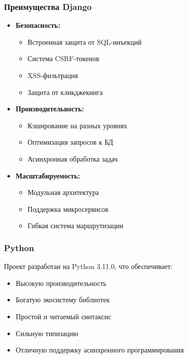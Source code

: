 \documentclass[12pt,a4paper]{article}
\begin{document}
\subsubsection{Преимущества Django}
\begin{itemize}
    \item \textbf{Безопасность:}
    \begin{itemize}
        \item Встроенная защита от SQL-инъекций
        \item Система CSRF-токенов
        \item XSS-фильтрация
        \item Защита от кликджекинга
    \end{itemize}
    \item \textbf{Производительность:}
    \begin{itemize}
        \item Кэширование на разных уровнях
        \item Оптимизация запросов к БД
        \item Асинхронная обработка задач
    \end{itemize}
    \item \textbf{Масштабируемость:}
    \begin{itemize}
        \item Модульная архитектура
        \item Поддержка микросервисов
        \item Гибкая система маршрутизации
    \end{itemize}
\end{itemize}

\subsubsection{Python}
Проект разработан на Python 3.11.0, что обеспечивает:
\begin{itemize}
    \item Высокую производительность
    \item Богатую экосистему библиотек
    \item Простой и читаемый синтаксис
    \item Сильную типизацию
    \item Отличную поддержку асинхронного программирования
\end{itemize}
\end{document}
